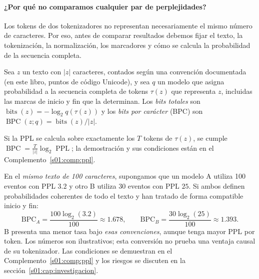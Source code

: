 \paragraph{¿Por qué no comparamos cualquier par de perplejidades?}
Los tokens de dos tokenizadores no representan necesariamente el mismo número de caracteres. Por eso, antes de comparar resultados debemos fijar el texto, la tokenización, la normalización, los marcadores y cómo se calcula la probabilidad de la secuencia completa.
\begin{definicion}\label{s01:def:bpc}
Sea $z$ un texto con $|z|$ caracteres, contados según una convención documentada
(en este libro, puntos de código Unicode), y sea $q$ un modelo que asigna
probabilidad a la secuencia completa de tokens $\tau(z)$ que representa $z$,
incluidas las marcas de inicio y fin que la determinan. Los \emph{bits totales}
son $\operatorname{bits}(z)=-\log_2q(\tau(z))$ y los \emph{bits por carácter}
(BPC) son $\operatorname{BPC}(z;q)=\operatorname{bits}(z)/|z|$.
\end{definicion}
\noindent Si la PPL se calcula sobre exactamente los $T$ tokens de $\tau(z)$, se
cumple $\operatorname{BPC}=\frac{T}{|z|}\log_2\operatorname{PPL}$; la demostración
y sus condiciones están en el Complemento~\ref{s01:comp:ppl}.
\begin{ejemplo}
En el \emph{mismo texto de 100 caracteres}, supongamos que un modelo A utiliza 100 eventos con PPL $3.2$ y otro B utiliza 30 eventos con PPL $25$. Si ambos definen probabilidades coherentes de todo el texto y han tratado de forma compatible inicio y fin:
\[
\mathrm{BPC}_A=\frac{100\log_2(3.2)}{100}\approx1.678,
\qquad
\mathrm{BPC}_B=\frac{30\log_2(25)}{100}\approx1.393.
\]
B presenta una menor tasa bajo \emph{esas convenciones}, aunque tenga mayor PPL por token. Los números son ilustrativos; esta conversión no prueba una ventaja causal de su tokenizador. Las condiciones se demuestran en el Complemento~\ref{s01:comp:ppl} y los riesgos se discuten en la sección~\ref{s01:cap:investigacion}.
\end{ejemplo}


